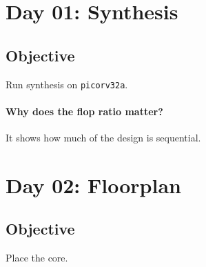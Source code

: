 
\chapter{Day 01: Synthesis}
\label{sec:rpt_day_01_synthesis}

\section{Objective}
\label{sec:rpt_objective}

Run synthesis on \verb|picorv32a|.

\subsubsection{Why does the flop ratio matter?}
\label{sec:rpt_why_does_the_flop_ratio_matter}

It shows how much of the design is sequential.

\chapter{Day 02: Floorplan}
\label{sec:rpt_day_02_floorplan}

\section{Objective}
\label{sec:rpt_objective_1}

Place the core.
